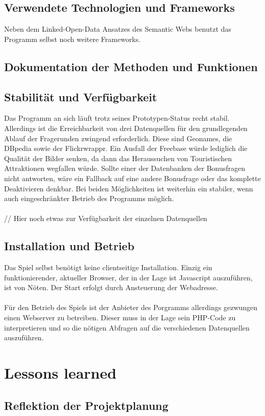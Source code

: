 \documentclass[a4paper, 11pt]{article}
\begin{document}
\subsection{Verwendete Technologien und Frameworks}
Neben dem Linked-Open-Data Ansatzes des Semantic Webs benutzt das Programm selbst noch weitere Frameworks.
\subsection{Dokumentation der Methoden und Funktionen}
\subsection{Stabilität und Verfügbarkeit}
Das Programm an sich läuft trotz seines Prototypen-Status recht stabil. Allerdings ist die Erreichbarkeit von drei Datenquellen für den grundlegenden Ablauf der Fragerunden zwingend erforderlich. Diese sind Geonames, die DBpedia sowie der Flickrwrappr. Ein Ausfall der Freebase würde lediglich die Qualität der Bilder senken, da dann das Heraussuchen von Touristischen Attraktionen wegfallen würde. Sollte einer der Datenbanken der Bonusfragen nicht antworten, wäre ein Fallback auf eine andere Bonusfrage oder das komplette Deaktivieren denkbar. Bei beiden Möglichkeiten ist weiterhin ein stabiler, wenn auch eingeschränkter Betrieb des Programms möglich.\\\\ // Hier noch etwas zur Verfügbarkeit der einzelnen Datenquellen
\subsection{Installation und Betrieb}
Das Spiel selbst benötigt keine clientseitige Installation. Einzig ein funktionierender, aktueller Browser, der in der Lage ist Javascript auszuführen, ist von Nöten. Der Start erfolgt durch Ansteuerung der Webadresse.\\\\Für den Betrieb des Spiels ist der Anbieter des Porgramms allerdings gezwungen einen Webserver zu betreiben. Dieser muss in der Lage sein PHP-Code zu interpretieren und so die nötigen Abfragen auf die verschiedenen Datenquellen auszuführen.
\newpage
\section{Lessons learned}
\subsection{Reflektion der Projektplanung}
\end{document}
